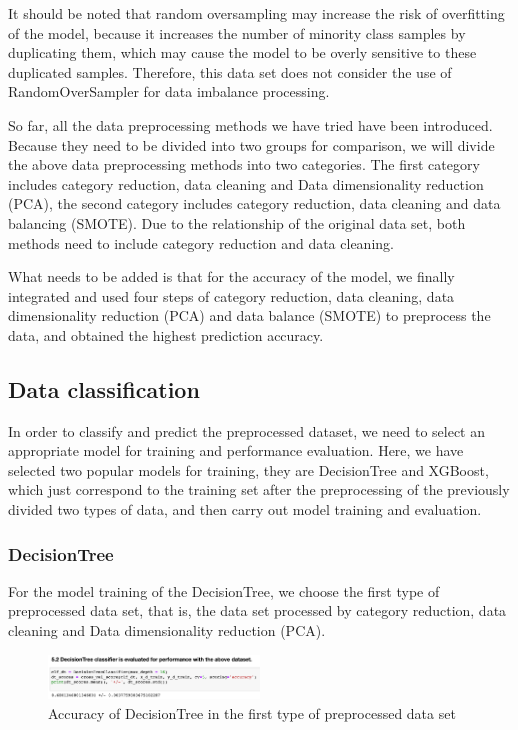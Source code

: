 \documentclass[conference]{IEEEtran}
\begin{document}
\begin{itemize}
It should be noted that random oversampling may increase the risk of overfitting of the model, because it increases the number of minority class samples by duplicating them, which may cause the model to be overly sensitive to these duplicated samples\cite{b6}. Therefore, this data set does not consider the use of RandomOverSampler for data imbalance processing.
\end{itemize}

So far, all the data preprocessing methods we have tried have been introduced. Because they need to be divided into two groups for comparison, we will divide the above data preprocessing methods into two categories. The first category includes category reduction, data cleaning and Data dimensionality reduction (PCA), the second category includes category reduction, data cleaning and data balancing (SMOTE). Due to the relationship of the original data set, both methods need to include category reduction and data cleaning.

What needs to be added is that for the accuracy of the model, we finally integrated and used four steps of category reduction, data cleaning, data dimensionality reduction (PCA) and data balance (SMOTE) to preprocess the data, and obtained the highest prediction accuracy.

\subsection{Data classification}

In order to classify and predict the preprocessed dataset, we need to select an appropriate model for training and performance evaluation. Here, we have selected two popular models for training, they are DecisionTree and XGBoost, which just correspond to the training set after the preprocessing of the previously divided two types of data, and then carry out model training and evaluation.

\subsubsection{DecisionTree}

For the model training of the DecisionTree, we choose the first type of preprocessed data set, that is, the data set processed by category reduction, data cleaning and Data dimensionality reduction (PCA).

\begin{figure}[H]
\centerline{\includegraphics[width=0.5\textwidth]{18.pic.jpg}}
\caption{Accuracy of DecisionTree in the first type of preprocessed data set}
\end{figure}
\end{document}

